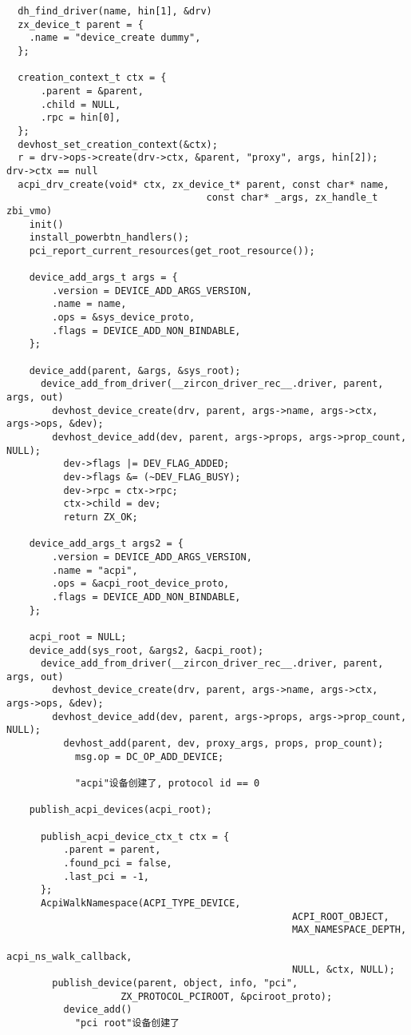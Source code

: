 \begin{verbatim}
  dh_find_driver(name, hin[1], &drv)
  zx_device_t parent = {
    .name = "device_create dummy",
  };

  creation_context_t ctx = {
      .parent = &parent,
      .child = NULL,
      .rpc = hin[0],
  };
  devhost_set_creation_context(&ctx);
  r = drv->ops->create(drv->ctx, &parent, "proxy", args, hin[2]);   drv->ctx == null
  acpi_drv_create(void* ctx, zx_device_t* parent, const char* name,
                                   const char* _args, zx_handle_t zbi_vmo)
    init()
    install_powerbtn_handlers();
    pci_report_current_resources(get_root_resource());

    device_add_args_t args = {
        .version = DEVICE_ADD_ARGS_VERSION,
        .name = name,
        .ops = &sys_device_proto,
        .flags = DEVICE_ADD_NON_BINDABLE,
    };

    device_add(parent, &args, &sys_root);
      device_add_from_driver(__zircon_driver_rec__.driver, parent, args, out)
        devhost_device_create(drv, parent, args->name, args->ctx, args->ops, &dev);
        devhost_device_add(dev, parent, args->props, args->prop_count, NULL);
          dev->flags |= DEV_FLAG_ADDED;
          dev->flags &= (~DEV_FLAG_BUSY);
          dev->rpc = ctx->rpc;
          ctx->child = dev;
          return ZX_OK;

    device_add_args_t args2 = {
        .version = DEVICE_ADD_ARGS_VERSION,
        .name = "acpi",
        .ops = &acpi_root_device_proto,
        .flags = DEVICE_ADD_NON_BINDABLE,
    };

    acpi_root = NULL;
    device_add(sys_root, &args2, &acpi_root);
      device_add_from_driver(__zircon_driver_rec__.driver, parent, args, out)
        devhost_device_create(drv, parent, args->name, args->ctx, args->ops, &dev);
        devhost_device_add(dev, parent, args->props, args->prop_count, NULL);
          devhost_add(parent, dev, proxy_args, props, prop_count);
            msg.op = DC_OP_ADD_DEVICE;

            "acpi"设备创建了, protocol id == 0

    publish_acpi_devices(acpi_root);

      publish_acpi_device_ctx_t ctx = {
          .parent = parent,
          .found_pci = false,
          .last_pci = -1,
      };
      AcpiWalkNamespace(ACPI_TYPE_DEVICE,
                                                  ACPI_ROOT_OBJECT,
                                                  MAX_NAMESPACE_DEPTH,
                                                  acpi_ns_walk_callback,
                                                  NULL, &ctx, NULL);
        publish_device(parent, object, info, "pci",
                    ZX_PROTOCOL_PCIROOT, &pciroot_proto);
          device_add()
            "pci root"设备创建了
\end{verbatim}